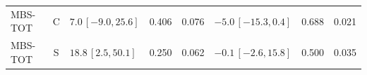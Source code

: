 \begin{longtable}{lcp{37mm}rrp{37mm}rr}
MBS-TOT & C & \(7.0\,[-9.0,25.6]\) & 0.406 & 0.076 & \(-5.0\,[-15.3,0.4]\) & 0.688 & 0.021\\
MBS-TOT & S & \(18.8\,[2.5,50.1]\) & 0.250 & 0.062 & \(-0.1\,[-2.6,15.8]\) & 0.500 & 0.035\\

\end{longtable}
